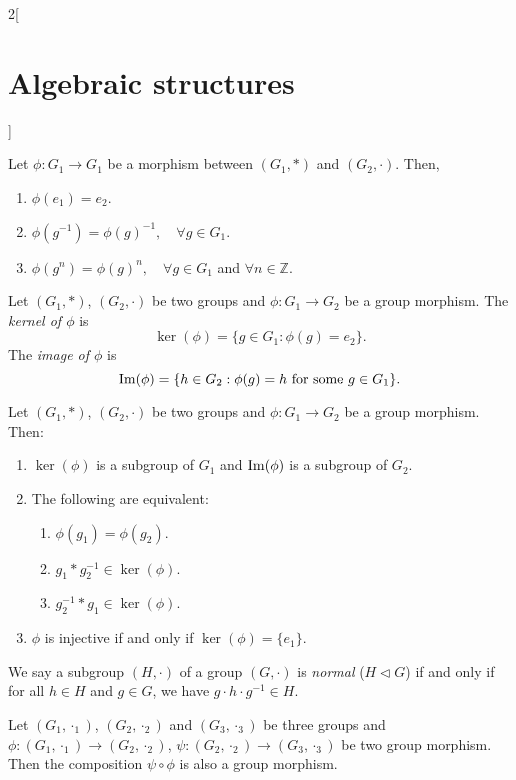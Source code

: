 \documentclass[class=article,10pt,crop=false]{standalone}
\begin{document}
\begin{multicols}{2}[\section{Algebraic structures}]
\begin{definition}
\end{definition}
\begin{lemma}
Let $\phi:G_1\rightarrow G_1$ be a morphism between $(G_1,*)$ and $(G_2,\cdot)$. Then,
\begin{enumerate}
    \item $\phi(e_1)=e_2$.
    \item $\phi(g^{-1})=\phi(g)^{-1},\quad\forall g\in G_1$.
    \item $\phi(g^n)=\phi(g)^n,\quad\forall g\in G_1$ and $\forall n\in\mathbb{Z}$.
\end{enumerate}
\end{lemma}
\begin{definition}
Let $(G_1,*)$, $(G_2,\cdot)$ be two groups and $\phi:G_1\rightarrow G_2$ be a group morphism. The \textit{kernel of $\phi$} is $$\ker(\phi)=\{g\in G_1:\phi(g)=e_2\}.$$ The \textit{image of $\phi$} is $$\operatorname{Im}(\phi)=\{h\in G_2:\phi(g)=h\text{ for some }g\in G_1\}.$$
\end{definition}
\begin{prop}
Let $(G_1,*)$, $(G_2,\cdot)$ be two groups and $\phi:G_1\rightarrow G_2$ be a group morphism. Then:
\begin{enumerate}
    \item $\ker(\phi)$ is a subgroup of $G_1$ and $\operatorname{Im}(\phi)$ is a subgroup of $G_2$.
    \item The following are equivalent:
    \begin{enumerate}
        \item $\phi(g_1)=\phi(g_2)$.
        \item $g_1*g_2^{-1}\in\ker(\phi)$.
        \item $g_2^{-1}*g_1\in\ker(\phi)$.
    \end{enumerate}
    \item $\phi$ is injective if and only if $\ker(\phi)=\{e_1\}$.
\end{enumerate}
\end{prop}
\begin{definition}
We say a subgroup $(H,\cdot)$ of a group $(G,\cdot)$ is \textit{normal} ($H\lhd G$) if and only if for all $h\in H$ and $g\in G$, we have $g\cdot h\cdot g^{-1}\in H$.
\end{definition}
\begin{prop}
Let $(G_1,\cdot_1)$, $(G_2,\cdot_2)$ and $(G_3,\cdot_3)$ be three groups and $\phi:(G_1,\cdot_1)\rightarrow(G_2,\cdot_2)$, $\psi:(G_2,\cdot_2)\rightarrow(G_3,\cdot_3)$ be two group morphism. Then the composition $\psi\circ\phi$ is also a group morphism.

\end{prop}
\end{multicols}
\end{document}
